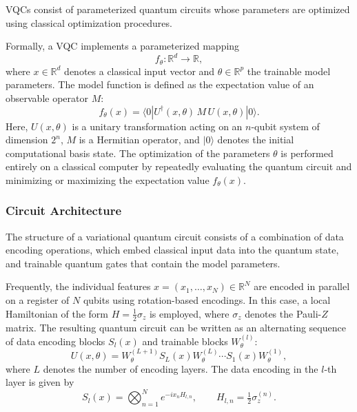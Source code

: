 VQCs consist of parameterized quantum circuits whose parameters are optimized using classical optimization procedures.

Formally, a VQC implements a parameterized mapping
\[
f_\theta : \mathbb{R}^d \to \mathbb{R},
\]
where $x \in \mathbb{R}^d$ denotes a classical input vector and
$\theta \in \mathbb{R}^p$ the trainable model parameters.
The model function is defined as the expectation value of an observable operator $M$:
\begin{equation}
f_\theta(x)
=
\langle 0 | U^\dagger(x,\theta)\, M \, U(x,\theta) | 0 \rangle.
\end{equation}
Here, $U(x,\theta)$ is a unitary transformation acting on an $n$-qubit system of dimension $2^n$, $M$ is a Hermitian operator, and $|0\rangle$ denotes the initial computational basis state.
The optimization of the parameters $\theta$ is performed entirely on a classical computer by repeatedly evaluating the quantum circuit and minimizing or maximizing the expectation value $f_\theta(x)$.

\subsubsection{Circuit Architecture}
\label{subsubsec:bg-vqc-architecture}

The structure of a variational quantum circuit consists of a combination of data encoding operations, which embed classical input data into the quantum state, and trainable quantum gates that contain the model parameters.

Frequently, the individual features
\(
x = (x_1,\dots,x_N) \in \mathbb{R}^N
\)
are encoded in parallel on a register of $N$ qubits using rotation-based encodings.
In this case, a local Hamiltonian of the form
\(
H = \tfrac{1}{2}\sigma_z
\)
is employed, where $\sigma_z$ denotes the Pauli-$Z$ matrix.
The resulting quantum circuit can be written as an alternating sequence of data encoding blocks $S_l(x)$ and trainable blocks $W_\theta^{(l)}$:
\begin{equation}
U(x,\theta)
=
W^{(L+1)}_\theta
S_L(x)
W^{(L)}_\theta
\cdots
S_1(x)
W^{(1)}_\theta,
\end{equation}
where $L$ denotes the number of encoding layers.
The data encoding in the $l$-th layer is given by
\begin{equation}
S_l(x)
=
\bigotimes_{n=1}^{N}
e^{-i x_n H_{l,n}},
\qquad
H_{l,n} = \tfrac{1}{2}\sigma_z^{(n)}.
\end{equation}

